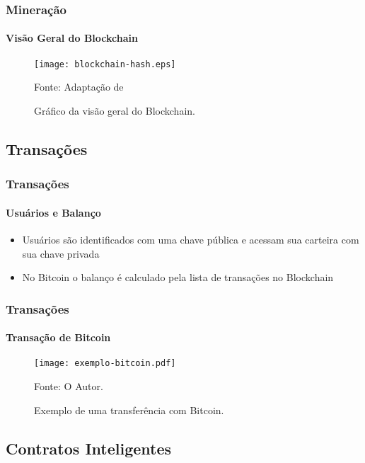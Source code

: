 \documentclass[aspectratio=43]{beamer}
\begin{document}
\begin{frame}
    \frametitle{Mineração}
    \framesubtitle{Visão Geral do Blockchain}
    
    \begin{figure}[H]
        \caption{\label{fig:blockchain-hash}Gráfico da visão geral
        do Blockchain.}
        \begin{center}
            \texttt{[image: blockchain-hash.eps]}
        \end{center}
        Fonte: Adaptação de \cite{Nakamoto2008}
    \end{figure}
\end{frame}

\subsection{Transações}

\begin{frame}
    \frametitle{Transações}
    \framesubtitle{Usuários e Balanço}
    
    \begin{itemize}
        \item Usuários são identificados com uma chave pública e
            acessam sua carteira com sua chave privada

        \item No Bitcoin o balanço é calculado pela lista de
            transações no Blockchain

    \end{itemize}
\end{frame}

\begin{frame}
    \frametitle{Transações}
    \framesubtitle{Transação de Bitcoin}
    
    \begin{figure}[H]
        \caption{\label{fig:exemplo-bitcoin}Exemplo de uma transferência
            com Bitcoin.}
        \begin{center}
            \texttt{[image: exemplo-bitcoin.pdf]}
        \end{center}
        Fonte: O Autor.
    \end{figure}
\end{frame}

\subsection{Contratos Inteligentes}
\end{document}
